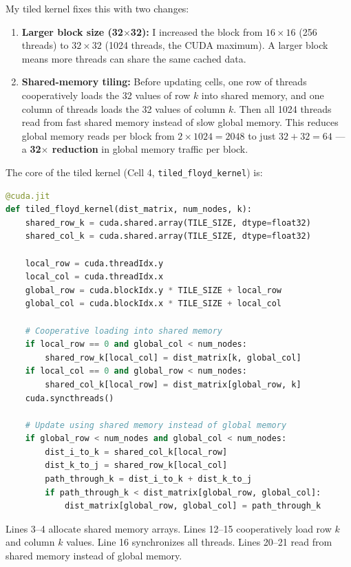 \documentclass[11pt]{article}
\begin{document}
My tiled kernel fixes this with two changes:

\begin{enumerate}
  \item \textbf{Larger block size (32$\times$32):} I increased the block from $16 \times 16$ (256 threads) to $32 \times 32$ (1024 threads, the CUDA maximum). A larger block means more threads can share the same cached data.

  \item \textbf{Shared-memory tiling:} Before updating cells, one row of threads cooperatively loads the 32 values of row $k$ into shared memory, and one column of threads loads the 32 values of column $k$. Then all 1024 threads read from fast shared memory instead of slow global memory. This reduces global memory reads per block from $2 \times 1024 = 2048$ to just $32 + 32 = 64$ --- a \textbf{32$\times$ reduction} in global memory traffic per block.
\end{enumerate}

The core of the tiled kernel (Cell 4, \texttt{tiled\_floyd\_kernel}) is:

\begin{lstlisting}[language=Python]
@cuda.jit
def tiled_floyd_kernel(dist_matrix, num_nodes, k):
    shared_row_k = cuda.shared.array(TILE_SIZE, dtype=float32)
    shared_col_k = cuda.shared.array(TILE_SIZE, dtype=float32)

    local_row = cuda.threadIdx.y
    local_col = cuda.threadIdx.x
    global_row = cuda.blockIdx.y * TILE_SIZE + local_row
    global_col = cuda.blockIdx.x * TILE_SIZE + local_col

    # Cooperative loading into shared memory
    if local_row == 0 and global_col < num_nodes:
        shared_row_k[local_col] = dist_matrix[k, global_col]
    if local_col == 0 and global_row < num_nodes:
        shared_col_k[local_row] = dist_matrix[global_row, k]
    cuda.syncthreads()

    # Update using shared memory instead of global memory
    if global_row < num_nodes and global_col < num_nodes:
        dist_i_to_k = shared_col_k[local_row]
        dist_k_to_j = shared_row_k[local_col]
        path_through_k = dist_i_to_k + dist_k_to_j
        if path_through_k < dist_matrix[global_row, global_col]:
            dist_matrix[global_row, global_col] = path_through_k
\end{lstlisting}

Lines 3--4 allocate shared memory arrays. Lines 12--15 cooperatively load row $k$ and column $k$ values. Line 16 synchronizes all threads. Lines 20--21 read from shared memory instead of global memory.
\end{document}
